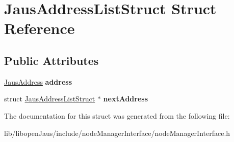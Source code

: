 \hypertarget{struct_jaus_address_list_struct}{\section{\-Jaus\-Address\-List\-Struct \-Struct \-Reference}
\label{struct_jaus_address_list_struct}
}
\subsection*{\-Public \-Attributes}
\begin{DoxyCompactItemize}
\item 
\hypertarget{struct_jaus_address_list_struct_a33cc8d92f42094161dbedd54c42d4e83}{\hyperlink{struct_jaus_address_struct}{\-Jaus\-Address} {\bfseries address}}\label{struct_jaus_address_list_struct_a33cc8d92f42094161dbedd54c42d4e83}

\item 
\hypertarget{struct_jaus_address_list_struct_a163453fa8355f680b691b7fd763b2292}{struct \hyperlink{struct_jaus_address_list_struct}{\-Jaus\-Address\-List\-Struct} $\ast$ {\bfseries next\-Address}}\label{struct_jaus_address_list_struct_a163453fa8355f680b691b7fd763b2292}

\end{DoxyCompactItemize}


\-The documentation for this struct was generated from the following file\-:\begin{DoxyCompactItemize}
\item 
lib/libopen\-Jaus/include/node\-Manager\-Interface/node\-Manager\-Interface.\-h\end{DoxyCompactItemize}
